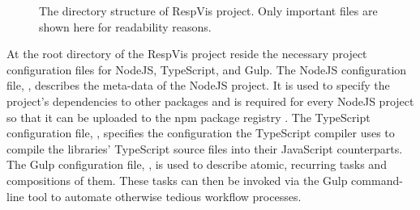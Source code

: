\begin{figure}[tp]
\centering
{}
\caption[RespVis Directory Structure]{
  The directory structure of RespVis project. 
  Only important files are shown here for readability reasons.
}
\label{fig:RespVisDirTree}
\end{figure}

At the root directory of the RespVis project reside the necessary project configuration files for NodeJS, TypeScript, and Gulp.
The NodeJS configuration file, , describes the meta-data of the NodeJS project.
It is used to specify the project's dependencies to other packages and is required for every NodeJS project so that it can be uploaded to the npm package registry \parencite{npm}.
The TypeScript configuration file, , specifies the configuration the TypeScript compiler uses to compile the libraries' TypeScript source files into their JavaScript counterparts.
The Gulp configuration file, , is used to describe atomic, recurring tasks and compositions of them.
These tasks can then be invoked via the Gulp command-line tool to automate otherwise tedious workflow processes.


